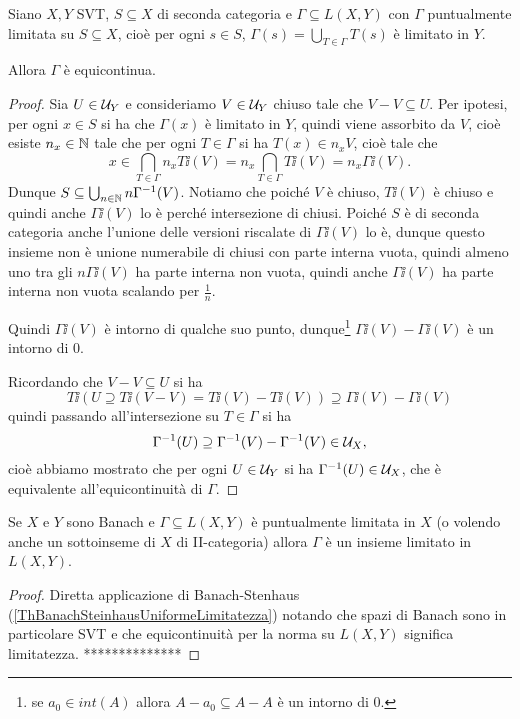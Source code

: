\begin{theorem}\label{ThBanachSteinhausUniformeLimitatezza}
Siano $X,Y$ SVT, $S\subseteq X$ di seconda categoria e $\Gamma\subseteq L(X,Y)$ con $\Gamma$ puntualmente limitata su $S\subseteq X$, cio\`e per ogni $s\in S$, $\Gamma(s)=\bigcup_{T\in \Gamma} T(s)$ \`e limitato in $Y$.

Allora $\Gamma$ \`e equicontinua.
\end{theorem}
\begin{proof}
Sia $U\in\mathcal{U}_Y$ e consideriamo $V\in\mathcal{U}_Y$ chiuso tale che $V-V\subseteq U$. Per ipotesi, per ogni $x\in S$ si ha che $\Gamma(x)$ \`e limitato in $Y$, quindi viene assorbito da $V$, cio\`e esiste $n_x\in\mathbb{N}$ tale che per ogni $T\in\Gamma$ si ha $T(x)\in n_x V$, cio\`e tale che
\[x\in\bigcap_{T\in \Gamma}n_xT\ii(V)=n_x\bigcap_{T\in \Gamma}T\ii(V)=n_x\Gamma\ii(V).\]
Dunque $S\subseteq \bigcup_{n\in\mathbb{N}}n\Gamma^{-1}(V)$. Notiamo che poich\'e $V$ \`e chiuso, $T\ii(V)$ \`e chiuso e quindi anche $\Gamma\ii(V)$ lo \`e perch\'e intersezione di chiusi. Poich\'e $S$ \`e di seconda categoria anche l'unione delle versioni riscalate di $\Gamma\ii(V)$ lo \`e, dunque questo insieme non \`e unione numerabile di chiusi con parte interna vuota, quindi almeno uno tra gli $n\Gamma\ii(V)$ ha parte interna non vuota, quindi anche $\Gamma\ii(V)$ ha parte interna non vuota scalando per $\frac1n$.

Quindi $\Gamma\ii(V)$ \`e intorno di qualche suo punto, dunque\footnote{se $a_0\in int(A)$ allora $A-a_0\subseteq A-A$ \`e un intorno di $0$.} $\Gamma\ii(V)-\Gamma\ii(V)$ \`e un intorno di $0$. 

Ricordando che $V-V\subseteq U$ si ha
\[T\ii(U\supseteq T\ii(V-V)=T\ii(V)-T\ii(V))\supseteq \Gamma\ii(V)-\Gamma\ii(V)\]
quindi passando all'intersezione su $T\in\Gamma$ si ha
\[\Gamma^{-1}(U)\supseteq \Gamma^{-1}(V)-\Gamma^{-1}(V)\in\mathcal{U}_X,\]
cio\`e abbiamo mostrato che per ogni $U\in\mathcal{U}_Y$ si ha $\Gamma^{-1}(U)\in\mathcal{U}_X$, che \`e equivalente all'equicontinuit\`a di $\Gamma$.
\end{proof}

\begin{corollary}\label{CorPuntualmenteLimitatoImplicaLimitatoPerNormaOperatore}
    Se $X$ e $Y$ sono Banach e $\Gamma\subseteq L(X,Y)$ \`e puntualmente limitata in $X$ (o volendo anche un sottoinseme di $X$ di II-categoria) allora $\Gamma$ \`e un insieme limitato in $L(X,Y)$.
\end{corollary}
\begin{proof}
Diretta applicazione di Banach-Stenhaus (\ref{ThBanachSteinhausUniformeLimitatezza}) notando che spazi di Banach sono in particolare SVT e che equicontinuit\`a per la norma su $L(X,Y)$ significa limitatezza. **************
\end{proof}

